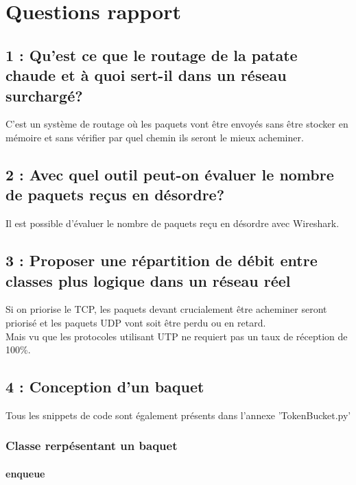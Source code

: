 \documentclass{article}
\begin{document}
\section{Questions rapport}

\subsection*{1 : Qu'est ce que le routage de la patate chaude et à quoi sert-il dans un réseau surchargé?}

C'est un système de routage où les paquets vont être envoyés sans être stocker en mémoire et sans vérifier par quel chemin ils seront le mieux acheminer. \cite{HotPotato}

\subsection*{2 : Avec quel outil peut-on évaluer le nombre de paquets reçus en désordre?}

Il est possible d'évaluer le nombre de paquets reçu en désordre avec Wireshark.


\subsection*{3 : Proposer une répartition de débit entre classes plus logique dans un réseau réel}

Si on priorise le TCP, les paquets devant crucialement être acheminer seront priorisé et les paquets UDP vont soit être perdu ou en retard. \\

Mais vu que les protocoles utilisant UTP ne requiert pas un taux de réception de 100\%. 

\subsection*{4 : Conception d'un baquet}

Tous les snippets de code sont également présents dans l'annexe 'TokenBucket.py'

\subsubsection{Classe rerpésentant un baquet}

\paragraph{enqueue}
\end{document}
